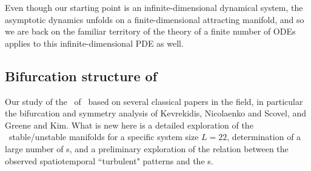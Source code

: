 % 
% 

Even though our starting point
is an infinite-dimensional dynamical system, the asymptotic dynamics
unfolds on a finite-dimensional attracting manifold, and so we are back on
the familiar territory of 
the theory of a finite number of ODEs applies to this
infinite-dimensional PDE as well.

\subsection{Bifurcation structure of \KS}
\label{sec:KSlit}
%

Our study of the \eqva\ of
\KSe\ based on several classical papers in the field,
in particular the bifurcation and symmetry analysis of
Kevrekidis, Nicolaenko and Scovel,
and
Greene and Kim. What is new here is
a detailed exploration of the \eqva\ stable/unstable manifolds
for a specific system size $L = 22$, determination
of a large number of \rpo s, and a preliminary
exploration of the relation between the
observed spatiotemporal ``turbulent" patterns and
the \rpo s.



